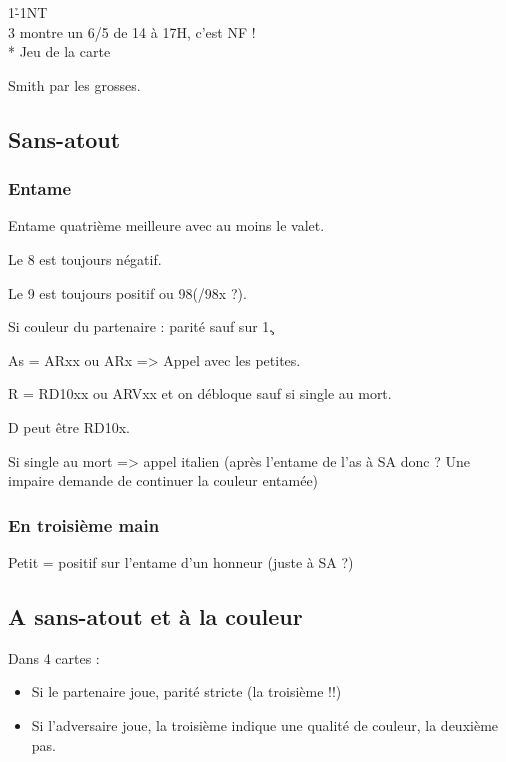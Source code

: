 \documentclass[a4paper]{article}
\begin{document}
\begin{bidtable}
1\h-1NT\\
3\s \> montre un 6/5 de 14 à 17H, c’est NF !\\
* \> Jeu de la carte
\end{bidtable}

Smith par les grosses.

\subsection{Sans-atout}

\subsubsection{Entame}

Entame quatrième meilleure avec au moins le valet.

Le 8 est toujours négatif.

Le 9 est toujours positif ou 98(/98x ?).

Si couleur du partenaire : parité sauf sur 1\c .

As = ARxx ou ARx => Appel avec les petites.

R = RD10xx ou ARVxx et on débloque sauf si single au mort.

D peut être RD10x.

Si single au mort => appel italien (après l'entame de l'as à SA donc ? Une impaire demande de continuer la couleur entamée)

\subsubsection{En troisième main}

Petit = positif sur l'entame d'un honneur (juste à SA ?)

\subsection{A sans-atout et à la couleur}

Dans 4 cartes :

\begin{itemize}
\item Si le partenaire joue, parité stricte (la troisième !!)

\end{itemize}

\begin{itemize}
\item Si l'adversaire joue, la troisième indique une qualité de couleur, la deuxième pas.

\end{itemize}
\end{document}
